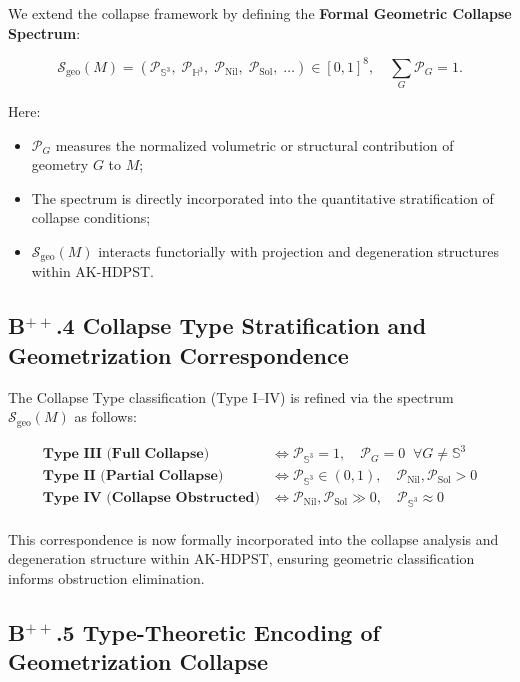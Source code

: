 \documentclass[11pt]{article}
\begin{document}
We extend the collapse framework by defining the \textbf{Formal Geometric Collapse Spectrum}:

\[
\mathcal{S}_{\mathrm{geo}}(M) = \left( \mathcal{P}_{\mathbb{S}^3},\; \mathcal{P}_{\mathbb{H}^3},\; \mathcal{P}_{\mathrm{Nil}},\; \mathcal{P}_{\mathrm{Sol}},\; \ldots \right) \in [0,1]^8,\quad \sum_G \mathcal{P}_G = 1.
\]

Here:

\begin{itemize}
    \item $\mathcal{P}_G$ measures the normalized volumetric or structural contribution of geometry $G$ to $M$;
    \item The spectrum is directly incorporated into the quantitative stratification of collapse conditions;
    \item $\mathcal{S}_{\mathrm{geo}}(M)$ interacts functorially with projection and degeneration structures within AK-HDPST.
\end{itemize}

\subsection*{B$^{++}$.4 Collapse Type Stratification and Geometrization Correspondence}

The Collapse Type classification (Type I–IV) is refined via the spectrum $\mathcal{S}_{\mathrm{geo}}(M)$ as follows:

\[
\begin{array}{ll}
\textbf{Type III (Full Collapse)} & \iff \mathcal{P}_{\mathbb{S}^3} = 1,\quad \mathcal{P}_G = 0\;\; \forall G \neq \mathbb{S}^3 \\
\textbf{Type II (Partial Collapse)} & \iff \mathcal{P}_{\mathbb{S}^3} \in (0,1),\quad \mathcal{P}_{\mathrm{Nil}},\mathcal{P}_{\mathrm{Sol}} > 0 \\
\textbf{Type IV (Collapse Obstructed)} & \iff \mathcal{P}_{\mathrm{Nil}},\mathcal{P}_{\mathrm{Sol}} \gg 0,\quad \mathcal{P}_{\mathbb{S}^3} \approx 0 \\
\end{array}
\]

This correspondence is now formally incorporated into the collapse analysis and degeneration structure within AK-HDPST, ensuring geometric classification informs obstruction elimination.

\subsection*{B$^{++}$.5 Type-Theoretic Encoding of Geometrization Collapse}
\end{document}

